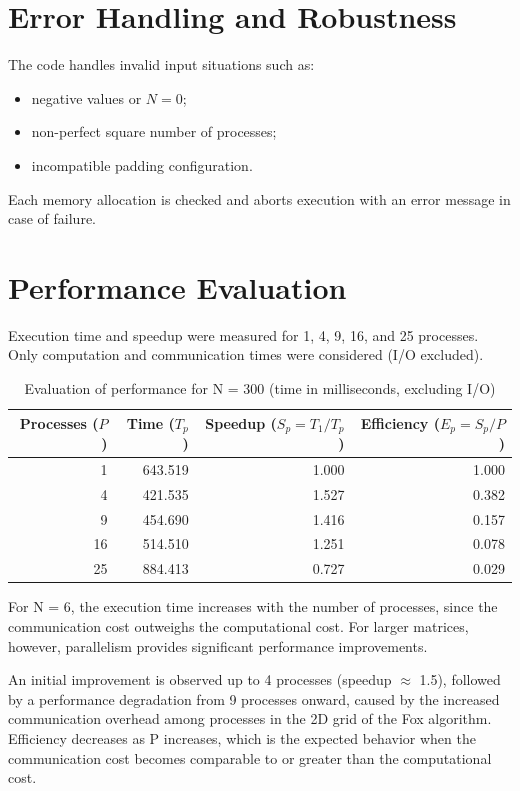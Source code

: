 \documentclass[10pt,a4paper]{article}
\begin{document}
\section{Error Handling and Robustness}
The code handles invalid input situations such as:
\begin{itemize}
  \item negative values or \(N = 0\);
  \item non-perfect square number of processes;
 \item incompatible padding configuration.
\end{itemize}
Each memory allocation is checked and aborts execution with an error message in case of failure.

\section{Performance Evaluation}
Execution time and speedup were measured for 1, 4, 9, 16, and 25 processes.  
Only computation and communication times were considered (I/O excluded).

\begin{table}[H]
\centering
\caption{Evaluation of performance for N = 300 (time in milliseconds, excluding I/O)}
\begin{tabular}{r r r r}
\toprule
Processes ($P$) & Time ($T_p$) & Speedup ($S_p = T_1 / T_p$) & Efficiency ($E_p = S_p / P$) \\
\midrule
1  & 643.519 & 1.000 & 1.000 \\
4  & 421.535 & 1.527 & 0.382 \\
9  & 454.690 & 1.416 & 0.157 \\
16 & 514.510 & 1.251 & 0.078 \\
25 & 884.413 & 0.727 & 0.029 \\
\bottomrule
\end{tabular}
\end{table}

For N = 6, the execution time increases with the number of processes, since the communication cost outweighs the computational cost.
For larger matrices, however, parallelism provides significant performance improvements.

An initial improvement is observed up to 4 processes (speedup $\approx$ 1.5), followed by a performance degradation from 9 processes onward, caused by the increased communication overhead among processes in the 2D grid of the Fox algorithm.
Efficiency decreases as P increases, which is the expected behavior when the communication cost becomes comparable to or greater than the computational cost.   
\end{document}
